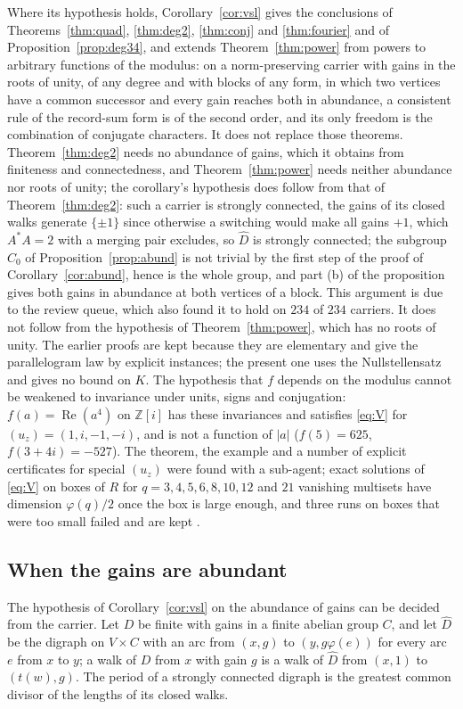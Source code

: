Where its hypothesis holds, Corollary~\ref{cor:vsl} gives the conclusions of Theorems~\ref{thm:quad}, \ref{thm:deg2}, \ref{thm:conj} and \ref{thm:fourier} and of Proposition~\ref{prop:deg34}, and extends Theorem~\ref{thm:power} from powers to arbitrary functions of the modulus: on a norm-preserving carrier with gains in the roots of unity, of any degree and with blocks of any form, in which two vertices have a common successor and every gain reaches both in abundance, a consistent rule of the record-sum form is of the second order, and its only freedom is the combination of conjugate characters. It does not replace those theorems. Theorem~\ref{thm:deg2} needs no abundance of gains, which it obtains from finiteness and connectedness, and Theorem~\ref{thm:power} needs neither abundance nor roots of unity; the corollary's hypothesis does follow from that of Theorem~\ref{thm:deg2}: such a carrier is strongly connected, the gains of its closed walks generate $\{\pm1\}$ since otherwise a switching would make all gains $+1$, which $A^*A=2$ with a merging pair excludes, so $\hat D$ is strongly connected; the subgroup $C_0$ of Proposition~\ref{prop:abund} is not trivial by the first step of the proof of Corollary~\ref{cor:abund}, hence is the whole group, and part (b) of the proposition gives both gains in abundance at both vertices of a block. This argument is due to the review queue, which also found it to hold on $234$ of $234$ carriers. It does not follow from the hypothesis of Theorem~\ref{thm:power}, which has no roots of unity. The earlier proofs are kept because they are elementary and give the parallelogram law by explicit instances; the present one uses the Nullstellensatz and gives no bound on $K$. The hypothesis that $f$ depends on the modulus cannot be weakened to invariance under units, signs and conjugation: $f(a)=\operatorname{Re}(a^4)$ on $\mathbb{Z}[i]$ has these invariances and satisfies \eqref{eq:V} for $(u_z)=(1,i,-1,-i)$, and is not a function of $|a|$ ($f(5)=625$, $f(3+4i)=-527$). The theorem, the example and a number of explicit certificates for special $(u_z)$ were found with a sub-agent; exact solutions of \eqref{eq:V} on boxes of $R$ for $q=3,4,5,6,8,10,12$ and $21$ vanishing multisets have dimension $\varphi(q)/2$ once the box is large enough, and three runs on boxes that were too small failed and are kept \cite{comp4s}.

\subsection{When the gains are abundant}
The hypothesis of Corollary~\ref{cor:vsl} on the abundance of gains can be decided from the carrier. Let $D$ be finite with gains in a finite abelian group $C$, and let $\hat D$ be the digraph on $V\times C$ with an arc from $(x,g)$ to $(y,g\varphi(e))$ for every arc $e$ from $x$ to $y$; a walk of $D$ from $x$ with gain $g$ is a walk of $\hat D$ from $(x,1)$ to $(t(w),g)$. The period of a strongly connected digraph is the greatest common divisor of the lengths of its closed walks.

